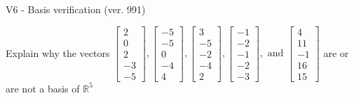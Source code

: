 \begin{exercise}
  \begin{exerciseTitle}V6 - Basis verification (ver. 991)\end{exerciseTitle}
  \begin{exerciseStatement}
    Explain why the vectors \(\left[\begin{array}{r}
2 \\
0 \\
2 \\
-3 \\
-5
\end{array}\right] , \left[\begin{array}{r}
-5 \\
-5 \\
0 \\
-4 \\
4
\end{array}\right] , \left[\begin{array}{r}
3 \\
-5 \\
-2 \\
-4 \\
2
\end{array}\right] , \left[\begin{array}{r}
-1 \\
-2 \\
-1 \\
-2 \\
-3
\end{array}\right] , \text{ and } \left[\begin{array}{r}
4 \\
11 \\
-1 \\
16 \\
15
\end{array}\right]\) are or are not a basis of \(\mathbb{R}^5\)	



\end{exerciseStatement}
\end{exercise}
